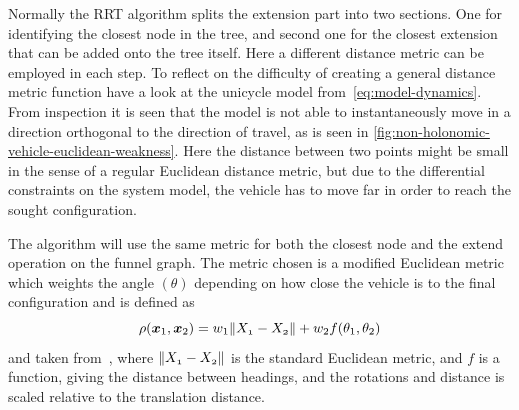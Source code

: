 Normally the \ac{RRT} algorithm splits the extension part into two sections. One
for identifying the closest node in the tree, and second one for the closest
extension that can be added onto the tree itself. Here a different distance
metric can be employed in each step. To reflect on the difficulty of creating a
general distance metric function have a look at the unicycle model
from~\cref{eq:model-dynamics}. From inspection it is seen that the model is not
able to instantaneously move in a direction orthogonal to the direction of
travel, as is seen in \cref{fig:non-holonomic-vehicle-euclidean-weakness}. Here
the distance between two points might be small in the sense of a regular
Euclidean distance metric, but due to the differential constraints on the system
model, the vehicle has to move far in order to reach the sought configuration.

The \rrtfunnel{} algorithm will use the same metric for both the closest node
and the extend operation on the funnel graph. The metric chosen is a modified
Euclidean metric which weights the angle \((\theta)\) depending on how close the
vehicle is to the final configuration and is defined as
\[
  \rho(\boldsymbol{x}_{1}, \boldsymbol{x}_{2}) = w_{1}\lVert\mathnormal{X_{1}} -
    \mathnormal{X_{2}}\rVert + w_{2}f(\theta_1,\theta_2)
\]
and taken from~\cite{kuffnerEffectiveSamplingDistance2004}, where
\(\lVert\mathnormal{X_{1}} - \mathnormal{X_{2}}\rVert\) is the standard Euclidean
metric, and \(f\) is a function, giving the distance between headings, and the
rotations and distance is scaled relative to the translation distance.

